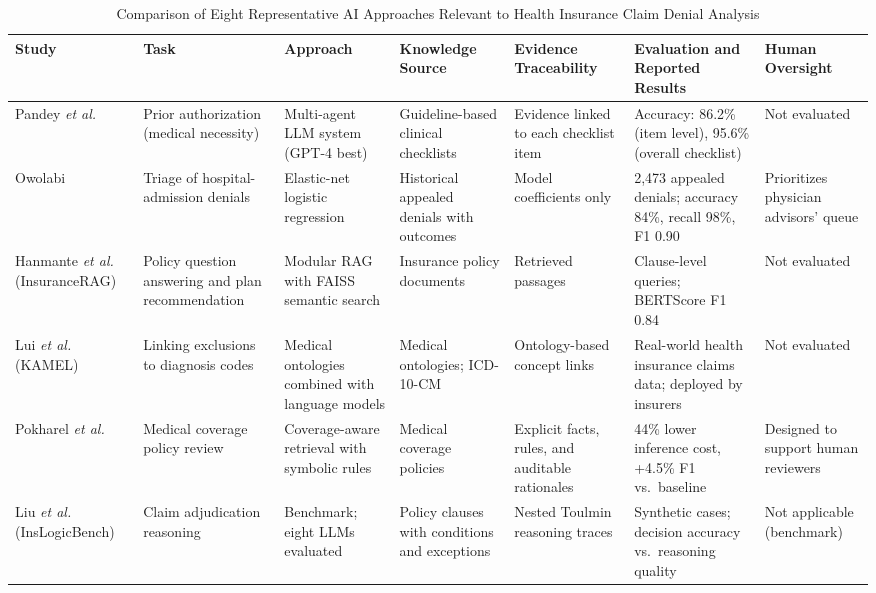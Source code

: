 \documentclass[conference]{IEEEtran}
\begin{document}
\begin{table}[!t]
\centering
\caption{Comparison of Eight Representative AI Approaches Relevant to Health Insurance Claim Denial Analysis}
\label{tab:literature}
\scriptsize
\setlength{\tabcolsep}{2.5pt}
\renewcommand{\arraystretch}{1.22}
\begin{tabularx}{\textwidth}{|P{2.2cm}|P{2.3cm}|P{2.3cm}|P{2.6cm}|P{2.6cm}|Y|P{1.5cm}|}
\hline
\textbf{Study} & \textbf{Task} & \textbf{Approach} & \textbf{Knowledge Source} & \textbf{Evidence Traceability} & \textbf{Evaluation and Reported Results} & \textbf{Human Oversight} \\
\hline
Pandey \textit{et al.}~\cite{pandey2024} &
Prior authorization (medical necessity) &
Multi-agent LLM system (GPT-4 best) &
Guideline-based clinical checklists &
Evidence linked to each checklist item &
Accuracy: 86.2\% (item level), 95.6\% (overall checklist) &
Not evaluated \\
\hline
Owolabi~\cite{owolabi2025} &
Triage of hospital-admission denials &
Elastic-net logistic regression &
Historical appealed denials with outcomes &
Model coefficients only &
2,473 appealed denials; accuracy 84\%, recall 98\%, F1 0.90 &
Prioritizes physician advisors' queue \\
\hline
Hanmante \textit{et al.}~\cite{hanmante2026} (InsuranceRAG) &
Policy question answering and plan recommendation &
Modular RAG with FAISS semantic search &
Insurance policy documents &
Retrieved passages &
Clause-level queries; BERTScore F1 0.84 &
Not evaluated \\
\hline
Lui \textit{et al.}~\cite{kamel2024} (KAMEL) &
Linking exclusions to diagnosis codes &
Medical ontologies combined with language models &
Medical ontologies; ICD-10-CM &
Ontology-based concept links &
Real-world health insurance claims data; deployed by insurers &
Not evaluated \\
\hline
Pokharel \textit{et al.}~\cite{pokharel2026} &
Medical coverage policy review &
Coverage-aware retrieval with symbolic rules &
Medical coverage policies &
Explicit facts, rules, and auditable rationales &
44\% lower inference cost, +4.5\% F1 vs.\ baseline &
Designed to support human reviewers \\
\hline
Liu \textit{et al.}~\cite{inslogicbench2026} (InsLogicBench) &
Claim adjudication reasoning &
Benchmark; eight LLMs evaluated &
Policy clauses with conditions and exceptions &
Nested Toulmin reasoning traces &
Synthetic cases; decision accuracy vs.\ reasoning quality &
Not applicable (benchmark) \\

\end{tabularx}
\end{table}
\end{document}
